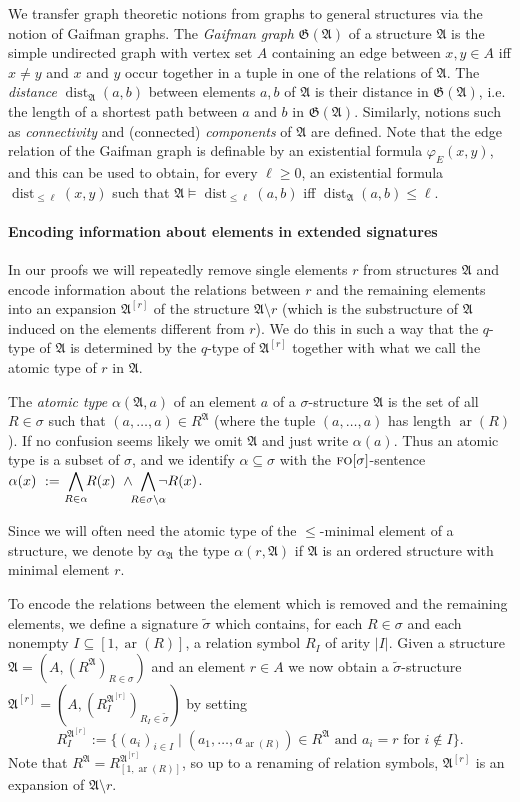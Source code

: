 \documentclass[11pt]{article}
\newcommand{\logic}[1]{\textsc{#1}}
\newcommand{\FO}{\logic{fo}}
\newcommand{\ar}{\operatorname{ar}}
\newcommand{\st}{\mathbin |}
\newcommand{\absval}[1]{\vert #1 \vert}
\newcommand{\bigland}{\bigwedge}
\newcommand{\struct}[1]{\mathfrak{#1}}
\newcommand{\AS}{\struct{A}}
\newcommand{\GG}{\struct{G}}
\DeclareMathOperator{\dist}{dist}
\newcommand{\setc}[2]{\{#1 \st #2\}}
\begin{document}
We transfer graph theoretic notions from graphs to general structures via the
notion of Gaifman graphs. The \emph{Gaifman graph} $\GG(\AS)$ of a structure
$\AS$ is the simple undirected graph with vertex set $A$ containing an edge
between $x,y\in A$ iff $x \neq y$ and $x$ and $y$ occur together in a tuple in
one of the relations of $\AS$. The \emph{distance} $\dist_{\AS}(a,b)$ between
elements $a,b$ of $\AS$ is their distance in $\GG(\AS)$, i.e. the length of a
shortest path between $a$ and $b$ in $\GG(\AS)$.  Similarly, notions such as
\emph{connectivity} and (connected) \emph{components} of $\AS$ are defined. Note
that the edge relation of the Gaifman graph is definable by an existential
formula $\varphi_E(x,y)$, and this can be used to obtain, for every $\ell \geq
0$, an existential formula $\dist_{\leq \ell}(x,y)$ such that $\AS \models
\dist_{\leq \ell}(a,b)$ iff $\dist_{\AS}(a,b) \leq \ell$.

\paragraph{Encoding information about elements in extended
  signatures}

In our proofs we will repeatedly remove single elements $r$ from
structures $\AS$ and encode information about the relations between
$r$ and the remaining elements into an expansion $\AS^{[r]}$ of the
structure $\AS \setminus r$ (which is the substructure of $\AS$
induced on the elements different from $r$). We do this in such a way
that the $q$-type of $\AS$ is determined by the $q$-type of
$\AS^{[r]}$ together with what we call the atomic type of $r$ in
$\AS$.

The \emph{atomic type} $\alpha(\AS,a)$ of an element $a$ of a $\sigma$-structure
$\AS$ is the set of all $R\in \sigma$ such that $(a, \ldots, a)\in R^{\AS}$
(where the tuple $(a, \ldots, a)$ has length $\ar(R)$). If no confusion seems
likely we omit $\AS$ and just write $\alpha(a)$. Thus an atomic type is a
subset of $\sigma$, and we identify $\alpha \subseteq \sigma$ with the
$\FO[\sigma]$-sentence
$\alpha(x)\ :=\ \smashoperator{\bigland_{R\in \alpha}} R(x) \ \land
\ \smashoperator{\bigland_{R\in \sigma\setminus\alpha}} \lnot
R(x)$.

Since we will often need the atomic type of the $\leq$-minimal element
of a structure, we denote by $\alpha_{\AS}$ the type $\alpha(r,\AS)$
if $\AS$ is an ordered structure with minimal element $r$.

To encode the relations between the element which is removed and the
remaining elements, we define a signature $\tilde\sigma$ which
contains, for each $R\in \sigma$ and each nonempty $I \subseteq
[1,\ar(R)]$, a relation symbol $R_I$ of arity $\absval{I}$. Given a
structure $\AS = (A,(R^{\AS})_{R \in \sigma})$ and an element $r \in
A$ we now obtain a $\tilde\sigma$-structure $\AS^{[r]} = (A,
(R_I^{\AS^{[r]}})_{R_I \in \tilde\sigma})$ by setting
\[
R_I^{\AS^{[r]}} := \setc{(a_i)_{i \in I}}{ (a_1,\ldots, a_{\ar(R)}) \in
R^{\AS}\text{ and }a_i = r\text{ for }i \not\in I }.
\]
Note that $R^{\AS} = R_{[1,\ar(R)]}^{\AS^{[r]}}$, so up to a renaming
of relation symbols, $\AS^{[r]}$ is an expansion of $\AS \setminus
r$.
\end{document}
